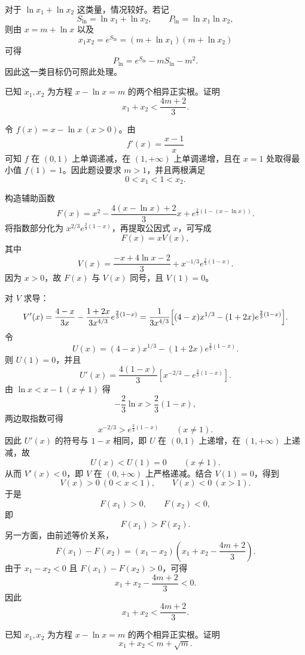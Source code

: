 对于 \(\ln x_1+\ln x_2\) 这类量，情况较好。若记
\[
S_{\ln}=\ln x_1+\ln x_2,\qquad P_{\ln}=\ln x_1\ln x_2,
\]
则由 \(x=m+\ln x\) 以及
\[
x_1x_2=e^{S_{\ln}}=(m+\ln x_1)(m+\ln x_2)
\]
可得
\[
P_{\ln}=e^{S_{\ln}}-mS_{\ln}-m^2.
\]
因此这一类目标仍可照此处理。

\begin{example}
已知 \(x_1,x_2\) 为方程 \(x-\ln x=m\) 的两个相异正实根。证明
\[
x_1+x_2<\frac{4m+2}{3}.
\]
\end{example}

\begin{solution}
令 \(f(x)=x-\ln x\ (x>0)\)。由
\[
f'(x)=\frac{x-1}{x}
\]
可知 \(f\) 在 \((0,1)\) 上单调递减，在 \((1,+\infty)\) 上单调递增，且在 \(x=1\) 处取得最小值 \(f(1)=1\)。因此题设要求 \(m>1\)，并且两根满足
\[
0<x_1<1<x_2.
\]

构造辅助函数
\[
F(x)=x^2-\frac{4(x-\ln x)+2}{3}x+e^{\frac23(1-(x-\ln x))}.
\]
将指数部分化为 \(x^{2/3}e^{\frac23(1-x)}\)，再提取公因式 \(x\)，可写成
\[
F(x)=xV(x),
\]
其中
\[
V(x)=\frac{-x+4\ln x-2}{3}+x^{-1/3}e^{\frac23(1-x)}.
\]
因为 \(x>0\)，故 \(F(x)\) 与 \(V(x)\) 同号，且 \(V(1)=0\)。

对 \(V\) 求导：
\[
V'(x)=\frac{4-x}{3x}-\frac{1+2x}{3x^{4/3}}e^{\frac23(1-x)}
=\frac{1}{3x^{4/3}}\Bigl[(4-x)x^{1/3}-(1+2x)e^{\frac23(1-x)}\Bigr].
\]
令
\[
U(x)=(4-x)x^{1/3}-(1+2x)e^{\frac23(1-x)}.
\]
则 \(U(1)=0\)，并且
\[
U'(x)=\frac{4(1-x)}{3}\left[x^{-2/3}-e^{\frac23(1-x)}\right].
\]
由 \(\ln x<x-1\ (x\ne1)\) 得
\[
-\frac23\ln x>\frac23(1-x),
\]
两边取指数可得
\[
x^{-2/3}>e^{\frac23(1-x)}\qquad(x\ne1).
\]
因此 \(U'(x)\) 的符号与 \(1-x\) 相同，即 \(U\) 在 \((0,1)\) 上递增，在 \((1,+\infty)\) 上递减，故
\[
U(x)<U(1)=0\qquad(x\ne1).
\]
从而 \(V'(x)<0\)，即 \(V\) 在 \((0,+\infty)\) 上严格递减。结合 \(V(1)=0\)，得到
\[
V(x)>0\ (0<x<1),\qquad V(x)<0\ (x>1).
\]
于是
\[
F(x_1)>0,\qquad F(x_2)<0,
\]
即
\[
F(x_1)>F(x_2).
\]
另一方面，由前述等价关系，
\[
F(x_1)-F(x_2)=(x_1-x_2)\left(x_1+x_2-\frac{4m+2}{3}\right).
\]
由于 \(x_1-x_2<0\) 且 \(F(x_1)-F(x_2)>0\)，可得
\[
x_1+x_2-\frac{4m+2}{3}<0.
\]
因此
\[
x_1+x_2<\frac{4m+2}{3}.
\]
\end{solution}

\begin{example}
已知 \(x_1,x_2\) 为方程 \(x-\ln x=m\) 的两个相异正实根。证明
\[
x_1+x_2<m+\sqrt{m}.
\]
\end{example}

